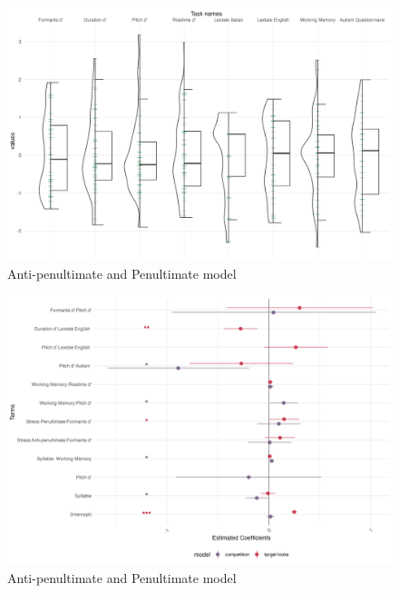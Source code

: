 \begin{figure}[H]
  \centering
  \includegraphics[width=1\linewidth]{visuals/plot_raw_task.jpeg} %
  \caption{Anti-penultimate and Penultimate model}
  \label{fig:plot_raw_task}
\end{figure}


\begin{figure}[H]
  \centering
  \includegraphics[width=1\linewidth]{visuals/target_vs_compet.jpeg} %
  \caption{Anti-penultimate and Penultimate model}
  \label{fig:target_vs_compet}
\end{figure}